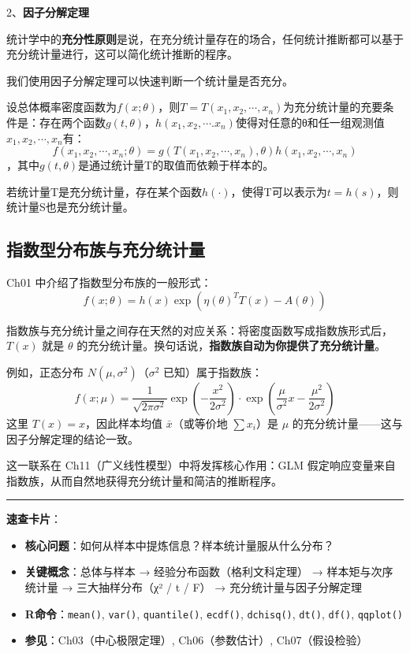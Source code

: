 \documentclass[
]{book}
\providecommand{\tightlist}{%
  \setlength{\itemsep}{0pt}\setlength{\parskip}{0pt}}
\begin{document}
2、\textbf{因子分解定理}

统计学中的\textbf{充分性原则}是说，在充分统计量存在的场合，任何统计推断都可以基于充分统计量进行，这可以简化统计推断的程序。

我们使用因子分解定理可以快速判断一个统计量是否充分。

设总体概率密度函数为\(f(x;\theta)\)，则\(T=T(x_1,x_2,\cdots,x_n)\)为充分统计量的充要条件是：存在两个函数\(g(t,\theta)\)，\(h(x_1,x_2,\cdots.x_n)\)使得对任意的θ和任一组观测值\(x_1,x_2,\cdots,x_n\)有：
\[
f(x_1,x_2,\cdots,x_n;\theta)=g(T(x_1,x_2,\cdots,x_n),\theta)h(x_1,x_2,\cdots,x_n)
\]
，其中\(g(t,\theta)\)是通过统计量T的取值而依赖于样本的。

若统计量T是充分统计量，存在某个函数\(h(\cdot)\)，使得T可以表示为\(t=h(s)\)，则统计量S也是充分统计量。

\subsection{指数型分布族与充分统计量}\label{ux6307ux6570ux578bux5206ux5e03ux65cfux4e0eux5145ux5206ux7edfux8ba1ux91cf}

Ch01 中介绍了指数型分布族的一般形式：
\[
f(x;\theta) = h(x)\exp\left(\eta(\theta)^T T(x) - A(\theta)\right)
\]

指数族与充分统计量之间存在天然的对应关系：将密度函数写成指数族形式后，\(T(x)\) 就是 \(\theta\) 的充分统计量。换句话说，\textbf{指数族自动为你提供了充分统计量}。

例如，正态分布 \(N(\mu, \sigma^2)\)（\(\sigma^2\) 已知）属于指数族：
\[
f(x;\mu) = \frac{1}{\sqrt{2\pi\sigma^2}}\exp\left(-\frac{x^2}{2\sigma^2}\right) \cdot \exp\left(\frac{\mu}{\sigma^2}x - \frac{\mu^2}{2\sigma^2}\right)
\]
这里 \(T(x) = x\)，因此样本均值 \(\bar{x}\)（或等价地 \(\sum x_i\)）是 \(\mu\) 的充分统计量------这与因子分解定理的结论一致。

这一联系在 Ch11（广义线性模型）中将发挥核心作用：GLM 假定响应变量来自指数族，从而自然地获得充分统计量和简洁的推断程序。

\begin{center}\rule{0.5\linewidth}{0.5pt}\end{center}

\textbf{速查卡片}：

\begin{itemize}
\tightlist
\item
  \textbf{核心问题}：如何从样本中提炼信息？样本统计量服从什么分布？
\item
  \textbf{关键概念}：总体与样本 → 经验分布函数（格利文科定理） → 样本矩与次序统计量 → 三大抽样分布（χ² / t / F） → 充分统计量与因子分解定理
\item
  \textbf{R命令}：\texttt{mean()}, \texttt{var()}, \texttt{quantile()}, \texttt{ecdf()}, \texttt{dchisq()}, \texttt{dt()}, \texttt{df()}, \texttt{qqplot()}
\item
  \textbf{参见}：Ch03（中心极限定理）, Ch06（参数估计）, Ch07（假设检验）
\end{itemize}
\end{document}
